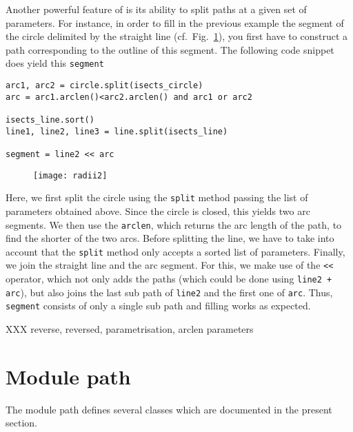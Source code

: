 Another powerful feature of \PyX{} is its ability to split paths at a
given set of parameters. For instance, in order to fill in the
previous example the segment of the circle delimited by the straight
line (cf.\ Fig.~\ref{fig:radii2}), you first have to construct a path
corresponding to the outline of this segment. The following code
snippet does yield this \verb|segment|
\begin{verbatim}
arc1, arc2 = circle.split(isects_circle)
arc = arc1.arclen()<arc2.arclen() and arc1 or arc2

isects_line.sort()
line1, line2, line3 = line.split(isects_line)

segment = line2 << arc
\end{verbatim}
\begin{figure}
\centerline{\texttt{[image: radii2]}}
\label{fig:radii2}
\end{figure}
Here, we first split the circle using the \verb|split| method passing
the list of parameters obtained above. Since the circle is closed,
this yields two arc segments. We then use the \verb|arclen|, which
returns the arc length of the path, to find the shorter of the two
arcs. Before splitting the line, we have to take into account that
the \verb|split| method only accepts a sorted list of parameters.
Finally, we join the straight line and the arc segment. For
this, we make use of the \verb|<<| operator, which not only adds
the paths (which could be done using \verb|line2 + arc|), but also
joins the last sub path of \verb|line2| and the first one of
\verb|arc|. Thus, \verb|segment| consists of only a single sub path
and filling works as expected.

XXX reverse, reversed, parametrisation, arclen parameters


\section{Module path}

The module path defines several classes which are documented
in the present section.


